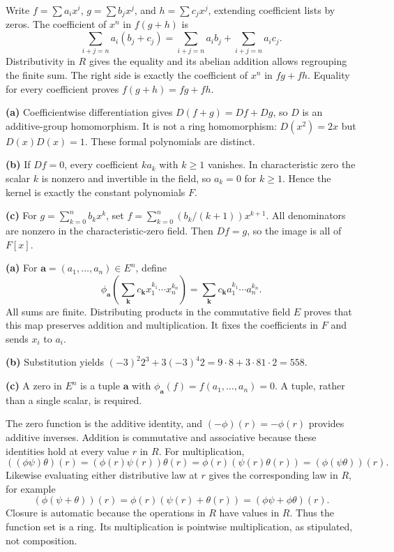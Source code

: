 Write $f=\sum a_ix^i$, $g=\sum b_jx^j$, and $h=\sum c_jx^j$, extending coefficient lists by zeros. The coefficient of $x^n$ in $f(g+h)$ is
\[\sum_{i+j=n}a_i(b_j+c_j)=\sum_{i+j=n}a_ib_j+\sum_{i+j=n}a_ic_j.
\]
Distributivity in $R$ gives the equality and its abelian addition allows regrouping the finite sum. The right side is exactly the coefficient of $x^n$ in $fg+fh$. Equality for every coefficient proves $f(g+h)=fg+fh$.

\textbf{(a)} Coefficientwise differentiation gives $D(f+g)=Df+Dg$, so $D$ is an additive-group homomorphism. It is not a ring homomorphism: $D(x^2)=2x$ but $D(x)D(x)=1$. These formal polynomials are distinct.\par
\textbf{(b)} If $Df=0$, every coefficient $ka_k$ with $k\ge1$ vanishes. In characteristic zero the scalar $k$ is nonzero and invertible in the field, so $a_k=0$ for $k\ge1$. Hence the kernel is exactly the constant polynomials $F$.\par
\textbf{(c)} For $g=\sum_{k=0}^n b_kx^k$, set $f=\sum_{k=0}^n (b_k/(k+1))x^{k+1}$. All denominators are nonzero in the characteristic-zero field. Then $Df=g$, so the image is all of $F[x]$.

\textbf{(a)} For $\boldsymbol a=(a_1,\ldots,a_n)\in E^n$, define
\[\phi_{\boldsymbol a}\!\left(\sum_{\boldsymbol k}c_{\boldsymbol k}x_1^{k_1}\cdots x_n^{k_n}\right)
=\sum_{\boldsymbol k}c_{\boldsymbol k}a_1^{k_1}\cdots a_n^{k_n}.
\]
All sums are finite. Distributing products in the commutative field $E$ proves that this map preserves addition and multiplication. It fixes the coefficients in $F$ and sends $x_i$ to $a_i$.\par
\textbf{(b)} Substitution yields $(-3)^2 2^3+3(-3)^4 2=9\cdot8+3\cdot81\cdot2=\boxed {558}$.\par
\textbf{(c)} A zero in $E^n$ is a tuple $\boldsymbol a$ with $\phi_{\boldsymbol a}(f)=f(a_1,\ldots,a_n)=0$. A tuple, rather than a single scalar, is required.

The zero function is the additive identity, and $(-\phi)(r)=-\phi(r)$ provides additive inverses. Addition is commutative and associative because these identities hold at every value $r$ in $R$. For multiplication,
\[((\phi\psi)\theta)(r)=(\phi(r)\psi(r))\theta(r)=\phi(r)(\psi(r)\theta(r))=(\phi(\psi\theta))(r).
\]
Likewise evaluating either distributive law at $r$ gives the corresponding law in $R$, for example
\[(\phi(\psi+\theta))(r)=\phi(r)(\psi(r)+\theta(r))=(\phi\psi+\phi\theta)(r).
\]
Closure is automatic because the operations in $R$ have values in $R$. Thus the function set is a ring. Its multiplication is pointwise multiplication, as stipulated, not composition.

